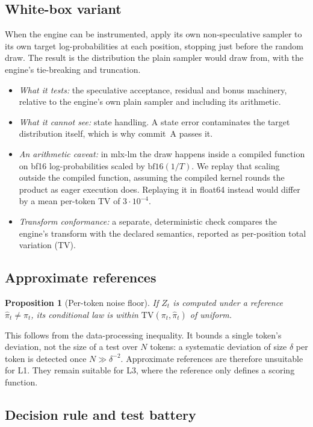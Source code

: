 \documentclass[10pt]{article}
\newtheorem{proposition}{Proposition}
\theoremstyle{remark}
\begin{document}
\subsection{White-box variant}
When the engine can be instrumented, apply its own non-speculative sampler to its own target log-probabilities at each position, stopping just before the random draw. The result is the distribution the plain sampler would draw from, with the engine's tie-breaking and truncation.
\begin{itemize}
\item \emph{What it tests:} the speculative acceptance, residual and bonus machinery, relative to the engine's own plain sampler and including its arithmetic.
\item \emph{What it cannot see:} state handling. A state error contaminates the target distribution itself, which is why commit~A passes it.
\item \emph{An arithmetic caveat:} in mlx-lm the draw happens inside a compiled function on bf16 log-probabilities scaled by $\mathrm{bf16}(1/T)$. We replay that scaling outside the compiled function, assuming the compiled kernel rounds the product as eager execution does. Replaying it in float64 instead would differ by a mean per-token TV of $3\cdot10^{-4}$.
\item \emph{Transform conformance:} a separate, deterministic check compares the engine's transform with the declared semantics, reported as per-position total variation (TV).
\end{itemize}

\subsection{Approximate references}
\begin{proposition}[Per-token noise floor]
If $Z_t$ is computed under a reference $\hat\pi_t\ne\pi_t$, its conditional law is within $\mathrm{TV}(\pi_t,\hat\pi_t)$ of uniform.
\end{proposition}
\noindent This follows from the data-processing inequality. It bounds a single token's deviation, not the size of a test over $N$ tokens: a systematic deviation of size $\delta$ per token is detected once $N\gg\delta^{-2}$. Approximate references are therefore unsuitable for L1. They remain suitable for L3, where the reference only defines a scoring function.

\subsection{Decision rule and test battery}\label{sec:battery}
\end{document}
